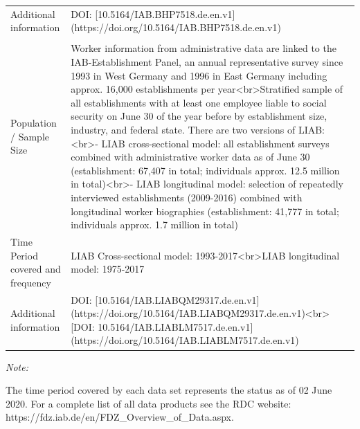 \begin{table}
{\begin{threeparttable}
\begin{tabular}[t]{>{\raggedright\arraybackslash}p{10em}>{\raggedright\arraybackslash}p{25em}}
\hspace{1em}\begin{minipage}[t]{2.5cm}\raggedright\setstretch{0.8}Additional information\end{minipage} & DOI: [10.5164/IAB.BHP7518.de.en.v1](https://doi.org/10.5164/IAB.BHP7518.de.en.v1)\\
\addlinespace[0.3em]
\multicolumn{2}{l}{\textbf{Linked Employer-Employee Data (LIAB)}}\\
\hspace{1em}\begin{minipage}[t]{2.5cm}\raggedright\setstretch{0.8}Population / Sample Size\end{minipage} & Worker information from administrative data are linked to the IAB-Establishment Panel, an annual representative survey since 1993 in West Germany and 1996 in East Germany including approx. 16,000 establishments per year<br>\newline     Stratified sample of all establishments with at least one employee liable to social security on June 30 of the year before by establishment size, industry, and federal state. There are two versions of LIAB:<br>- LIAB cross-sectional model: all establishment surveys combined with administrative worker data as of June 30 (establishment: 67,407 in total; individuals approx. 12.5 million in total)<br>- LIAB longitudinal model: selection of repeatedly interviewed establishments (2009-2016) combined with longitudinal worker biographies (establishment: 41,777 in total; individuals approx. 1.7 million in total)\\
\hspace{1em}\begin{minipage}[t]{2.5cm}\raggedright\setstretch{0.8}Time Period covered and frequency\end{minipage} & LIAB Cross-sectional model: 1993-2017<br>LIAB longitudinal model: 1975-2017\\
\hspace{1em}\begin{minipage}[t]{2.5cm}\raggedright\setstretch{0.8}Additional information\end{minipage} & DOI: [10.5164/IAB.LIABQM29317.de.en.v1](https://doi.org/10.5164/IAB.LIABQM29317.de.en.v1)<br>[DOI: 10.5164/IAB.LIABLM7517.de.en.v1](https://doi.org/10.5164/IAB.LIABLM7517.de.en.v1)\\
\bottomrule
\end{tabular}
\begin{tablenotes}
\item \textit{Note: } 
\item The time period covered by each data set represents the status as of 02 June 2020. For a complete list of all data products see the RDC website: https://fdz.iab.de/en/FDZ\_Overview\_of\_Data.aspx.
\end{tablenotes}
\end{threeparttable}}
\end{table}

